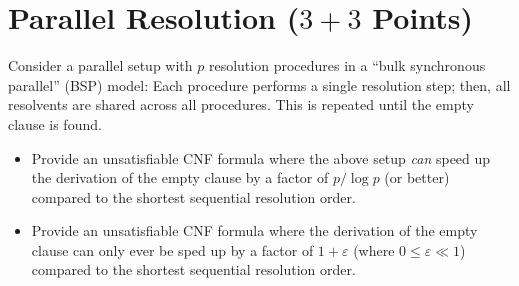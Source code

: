 \documentclass[a4paper]{article}
\begin{document}

\section{Parallel Resolution ($3+3$ Points)}

Consider a parallel setup with $p$ resolution procedures in a ``bulk synchronous parallel'' (BSP) model:
Each procedure performs a single resolution step; then, all resolvents are shared across all procedures. This is repeated until the empty clause is found.
\begin{itemize}
	\item[(a)] Provide an unsatisfiable CNF formula where the above setup \emph{can} speed up the derivation of the empty clause by a factor of $p / \log{p}$ (or better) compared to the shortest sequential resolution order.
	\item[(b)] Provide an unsatisfiable CNF formula where the derivation of the empty clause can only ever be sped up by a factor of $1 + \varepsilon$ (where $0 \leq \varepsilon \ll 1$) compared to the shortest sequential resolution order.
\end{itemize}
\end{document}
